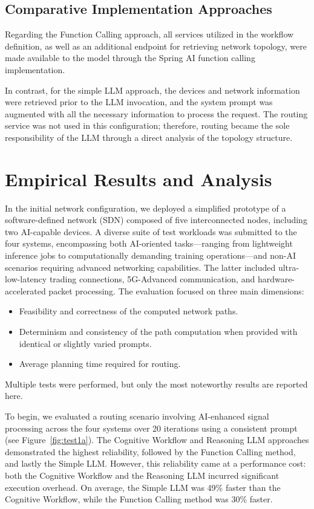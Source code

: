 \subsection{Comparative Implementation Approaches}
Regarding the Function Calling approach, all services utilized in the workflow definition, as well as an additional endpoint for retrieving network topology, were made available to the model through the Spring AI function calling implementation.

In contrast, for the simple LLM approach, the devices and network information were retrieved prior to the LLM invocation, and the system prompt was augmented with all the necessary information to process the request. The routing service was not used in this configuration; therefore, routing became the sole responsibility of the LLM through a direct analysis of the topology structure.


\section{Empirical Results and Analysis}\label{sec:AI4NE_res}

In the initial network configuration, we deployed a simplified prototype of a software-defined network (SDN) composed of five interconnected nodes, including two AI-capable devices. A diverse suite of test workloads was submitted to the four systems, encompassing both AI-oriented tasks—ranging from lightweight inference jobs to computationally demanding training operations—and non-AI scenarios requiring advanced networking capabilities. The latter included ultra-low-latency trading connections, 5G-Advanced communication, and hardware-accelerated packet processing. The evaluation focused on three main dimensions:

\begin{itemize}[leftmargin=*, label=--]
\item Feasibility and correctness of the computed network paths.
\item Determinism and consistency of the path computation when provided with identical or slightly varied prompts.
\item Average planning time required for routing.
\end{itemize}

Multiple tests were performed, but only the most noteworthy results are reported here.

To begin, we evaluated a routing scenario involving AI-enhanced signal processing across the four systems over 20 iterations using a consistent prompt (see Figure~\ref{fig:test1a}). The Cognitive Workflow and Reasoning LLM approaches demonstrated the highest reliability, followed by the Function Calling method, and lastly the Simple LLM. However, this reliability came at a performance cost: both the Cognitive Workflow and the Reasoning LLM incurred significant execution overhead. On average, the Simple LLM was 49\% faster than the Cognitive Workflow, while the Function Calling method was 30\% faster.

